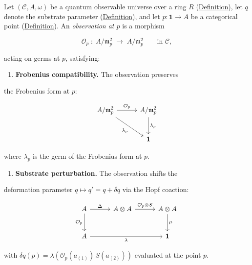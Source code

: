 \begin{definition}[Observation]
  \label{def:observation}
Let $(\mathcal{C}, A, \omega)$ be a quantum observable universe over a
ring $R$ (\hyperref[def:quantum-observable-universe]{Definition}), let $q$
denote the substrate parameter
(\hyperref[def:substrate-parameter]{Definition}), and let
$p \colon \mathbf{1} \to A$ be a categorical point
(\hyperref[def:categorical-point]{Definition}).  An
\emph{observation at $p$} is a morphism

\[
\mathcal{O}_p \;\colon\; A / \mathfrak{m}_p^2
  \;\longrightarrow\; A / \mathfrak{m}_p^2
  \qquad\text{in } \mathcal{C},
\]

acting on germs at $p$, satisfying:

\begin{enumerate}
  \item \textbf{Frobenius compatibility.} The observation preserves
\end{enumerate}
   the Frobenius form at $p$:

   \begin{equation}\label{eq:observation-frobenius}
   \begin{tikzcd}[row sep=2.5em, column sep=3em]
     A / \mathfrak{m}_p^2 \ar[r, "\mathcal{O}_p"] \ar[dr, "\lambda_p"']
     & A / \mathfrak{m}_p^2 \ar[d, "\lambda_p"] \\
     & \mathbf{1}
   \end{tikzcd}
   \end{equation}

   where $\lambda_p$ is the germ of the Frobenius form at $p$.

\begin{enumerate}
  \item \textbf{Substrate perturbation.} The observation shifts the
\end{enumerate}
   deformation parameter $q \mapsto q' = q + \delta q$ via the
   Hopf coaction:

   \begin{equation}\label{eq:observation-substrate}
   \begin{tikzcd}[row sep=2.5em, column sep=3em]
     A \ar[r, "\Delta"] \ar[d, "\mathcal{O}_p"']
     & A \otimes A \ar[r, "\mathcal{O}_p \otimes S"]
     & A \otimes A \ar[d, "\mu"] \\
     A \ar[rr, "\lambda"']
     & & \mathbf{1}
   \end{tikzcd}
   \end{equation}

   with $\delta q(p) = \lambda(\mathcal{O}_p(a_{(1)})\,S(a_{(2)}))$
   evaluated at the point $p$.
\end{definition}

